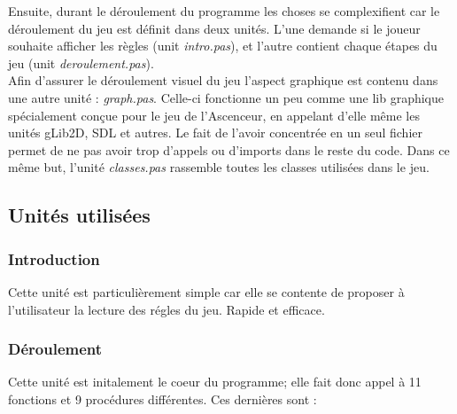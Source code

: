 \documentclass[12pt]{report}
\begin{document}
   Ensuite, durant le déroulement du programme les choses se complexifient car le déroulement du jeu est définit dans deux unités. L'une demande si le joueur souhaite afficher les règles (unit \textit{intro.pas}), et l'autre contient chaque étapes du jeu (unit \textit{deroulement.pas}). \\
   
 Afin d'assurer le déroulement visuel du jeu l'aspect graphique est contenu dans une autre unité : \textit{graph.pas}. Celle-ci fonctionne un peu comme une lib graphique spécialement conçue pour le jeu de l'Ascenceur, en appelant d'elle même les unités gLib2D, SDL et autres. Le fait de l'avoir concentrée en un seul fichier permet de ne pas avoir trop d'appels ou d'imports dans le reste du code. Dans ce même but, l'unité \textit{classes.pas} rassemble toutes les classes utilisées dans le jeu.
 \clearpage
   
   \subsection{Unités utilisées}

   	\subsubsection{Introduction}
   	Cette unité est particulièrement simple car elle se contente de proposer à l'utilisateur la lecture des régles du jeu. Rapide et efficace.
   	
 	\subsubsection{Déroulement}
  Cette unité est initalement le coeur du programme; elle fait donc appel à 11 fonctions et 9 procédures différentes. Ces dernières sont : \\
  
\end{document}
